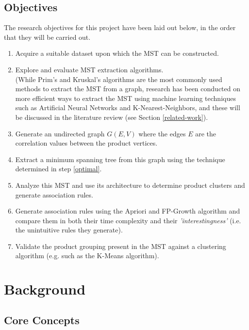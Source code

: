 \documentclass[a4paper,11pt]{article}
\begin{document}
\subsection{Objectives}
The research objectives for this project have been laid out below, in the order that they will be carried out.
\begin{enumerate}
\item Acquire a suitable dataset upon which the MST can be constructed.

\item \label{optimal} Explore and evaluate MST extraction algorithms.
\\(While Prim's \cite{prims}\cite{prims_og} and Kruskal's \cite{kruskal} algorithms are the most commonly used methods to extract the MST from a graph, research has been conducted on more efficient ways to extract the MST using machine learning techniques such as Artificial Neural Networks and K-Nearest-Neighbors, and these will be discussed in the literature review (see Section \ref{related-work}).

\item Generate an undirected graph $G(E,V)$ where the edges $E$ are the correlation values between the product vertices.

\item Extract a minimum spanning tree from this graph using the technique determined in step \ref{optimal}. 

\item Analyze this MST and use its architecture to determine product clusters and generate association rules.

\item Generate association rules using the Apriori and FP-Growth algorithm and compare them in both their time complexity and their \textit{'interestingness'} (i.e. the unintuitive rules they generate).

\item Validate the product grouping present in the MST against a clustering algorithm (e.g.  such as the K-Means algorithm).
\end{enumerate}

\newpage
\section{Background}
\subsection{Core Concepts} %
\end{document}

